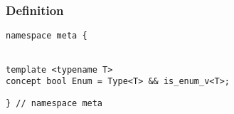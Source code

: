 
\subsubsection{Definition}

\begin{verbatim}
namespace meta {
\end{verbatim}
\begin{verbatim}

template <typename T>
concept bool Enum = Type<T> && is_enum_v<T>;

\end{verbatim}
\begin{verbatim}
} // namespace meta
\end{verbatim}
